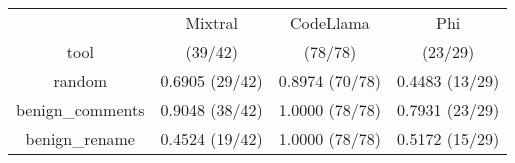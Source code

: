 \begin{table}[h!]
\centering
\begin{tabular}{|c|c|c|c|}
\hline
 & Mixtral & CodeLlama & Phi \\

tool & \cellcolor{blue!10}{0.9286} (39/42) & \cellcolor{blue!10}{1.0000} (78/78) & \cellcolor{blue!10}{0.7931} (23/29) \\

random & 0.6905 (29/42) & 0.8974 (70/78) & 0.4483 (13/29) \\

benign_comments & 0.9048 (38/42) & 1.0000 (78/78) & 0.7931 (23/29) \\

benign_rename & 0.4524 (19/42) & 1.0000 (78/78) & 0.5172 (15/29) \\

\end{tabular}
\end{table}